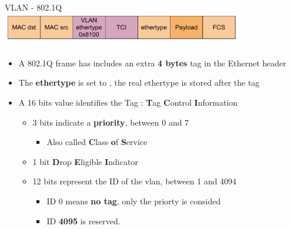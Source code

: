\begin{frame}{VLAN - 802.1Q}
	\includegraphics[width=0.8\textwidth]{slides/networking-stack-overview/ethernet_frame_vlan.pdf}

	\begin{itemize}
		\item A 802.1Q frame has includes an extra \textbf{4 bytes} tag in the Ethernet header
		\item The \textbf{ethertype} is set to , the real ethertype is stored after the tag
		\item A 16 bits value identifies the Tag : \textbf{T}ag \textbf{C}ontrol \textbf{I}nformation
			\begin{itemize}
				\item 3 bits indicate a \textbf{priority}, between 0 and 7
					\begin{itemize}
						\item Also called \textbf{C}lass \textbf{o}f \textbf{S}ervice
					\end{itemize}
				\item 1 bit \textbf{D}rop \textbf{E}ligible \textbf{I}ndicator
				\item 12 bits represent the ID of the vlan, between 1 and 4094
					\begin{itemize}
						\item ID 0 means \textbf{no tag}, only the priorty is consided
						\item ID \textbf{4095} is reserved.
					\end{itemize}
			\end{itemize}
	\end{itemize}
\end{frame}

